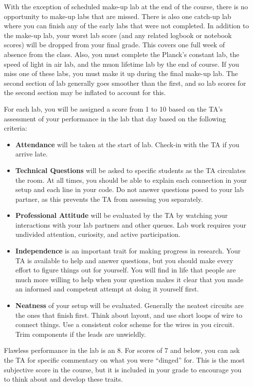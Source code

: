 \documentclass[12pt]{article}
\begin{document}
With the exception of scheduled make-up lab at the end of the course,
there is no opportunity to make-up labs that are missed.  There is
also one catch-up lab where you can finish any of the early labs that
were not completed.  In addition to the make-up lab, your worst lab
score (and any related logbook or notebook scores) will be dropped
from your final grade.  This covers one full week of absence from the
class.  Also, you must complete the Planck's constant lab, the speed
of light in air lab, and the muon lifetime lab by the end of course.
If you miss one of these labs, you must make it up during the final
make-up lab.  The second section of lab generally goes smoother than
the first, and so lab scores for the second section may be inflated to
account for this.

For each lab, you will be assigned a score from 1 to 10 based on the
TA's assessment of your performance in the lab that day based on the
following criteria:
\begin{itemize}
\item {\bf Attendance} will be taken at the start of lab. Check-in
  with the TA if you arrive late.
\item {\bf Technical Questions} will be asked to specific students as
  the TA circulates the room.  At all times, you should be able to
  explain each connection in your setup and each line in your code.
  Do not answer questions posed to your lab partner, as this prevents
  the TA from assessing you separately.
\item {\bf Professional Attitude} will be evaluated by the TA by watching your interactions with your lab partners and other queues.  Lab work requires your undivided attention, curiosity, and active participation.  
\item {\bf Independence} is an important trait for making progress in research.  Your TA is available to help and answer questions, but you should make every effort to figure things out for yourself.  You will find in life that people are much more willing to help when your question makes it clear that you made an informed and competent attempt at doing it yourself first.
\item {\bf Neatness} of your setup will be evaluated.  Generally the neatest circuits are the ones that finish first.  Think about layout, and use short loops of wire to connect things.  Use a consistent color scheme for the wires in you circuit.  Trim components if the leads are unwieldly.
\end{itemize}
Flawless performance in the lab is an 8.  For scores of 7 and below,
you can ask the TA for specific commentary on what you were ``dinged''
for.  This is the most subjective score in the course, but it is
included in your grade to encourage you to think about and develop
these traits.
\end{document}

